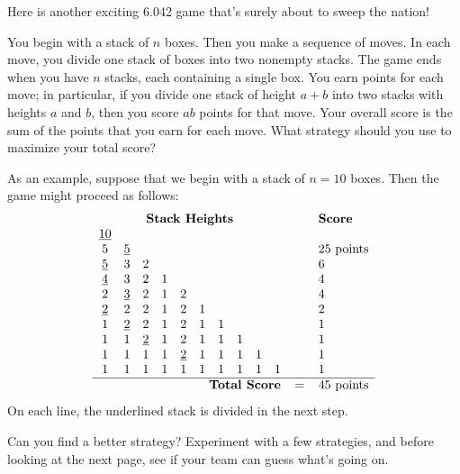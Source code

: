 
\inhandout{
\decideaboutsolutions
\usesimpleproblems
}


\begin{problem}
%
Here is another exciting 6.042 game that's surely about to sweep the
nation!

You begin with a stack of $n$ boxes.  Then you make a sequence of moves.
In each move, you divide one stack of boxes into two nonempty stacks.  The
game ends when you have $n$ stacks, each containing a single box.  You
earn points for each move; in particular, if you divide one stack of
height $a + b$ into two stacks with heights $a$ and $b$, then you score
$ab$ points for that move.  Your overall score is the sum of the points
that you earn for each move.  What strategy should you use to maximize
your total score?

As an example, suppose that we begin with a stack of $n = 10$ boxes.
Then the game might proceed as follows:
%
\[
\begin{array}{cccccccccccl}
\multicolumn{10}{c}{\textbf{Stack Heights}} & \quad & \textbf{Score} \\
\underline{10}&&&&&&&&& && \\
5&\underline{5}&&&&&&&& && 25 \text{ points} \\
\underline{5}&3&2&&&&&&& && 6 \\
\underline{4}&3&2&1&&&&&& && 4 \\
2&\underline{3}&2&1&2&&&&& && 4 \\
\underline{2}&2&2&1&2&1&&&& && 2 \\
1&\underline{2}&2&1&2&1&1&&& && 1 \\
1&1&\underline{2}&1&2&1&1&1&& && 1 \\
1&1&1&1&\underline{2}&1&1&1&1& && 1 \\
1&1&1&1&1&1&1&1&1&1 && 1 \\ \hline
\multicolumn{10}{r}{\textbf{Total Score}} & = & 45 \text{ points}
\end{array}
\]
%
On each line, the underlined stack is divided in the next step.

\bparts 

\ppart Can you find a better strategy?  Experiment with a few strategies,
and before looking at the next page, see if your team can guess what's
going on.


\end{problem}
